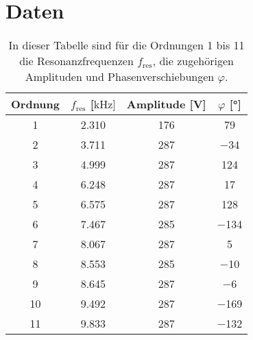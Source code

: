 \newpage
\section{Daten}
    \begin{table}[h]
        \centering
        \caption{In dieser Tabelle sind für die Ordnungen 1 bis 11 die Resonanzfrequenzen $f_{\text{res}}$, die zugehörigen Amplituden und Phasenverschiebungen $\varphi$.}
        \label{tab:phasenverschiebung}
        \begin{tabular}{c c c c}
        \toprule
        {Ordnung} & {$f_{\text{res}}$ [$\si{\kilo\hertz}]$} & {Amplitude [V]} & {$\varphi$ [°]} \\
        \midrule
        \num{1}  &  \num{2.310}  &  \num{176}  & \num{79}    \\
        \num{2}  &  \num{3.711}   &  \num{287}  & \num{-34}  \\
        \num{3}  &  \num{4.999}   &  \num{287}  & \num{124}  \\
        \num{4}  &  \num{6.248}   &  \num{287}  & \num{17}   \\
        \num{5}  &  \num{6.575}   &  \num{287}  & \num{128}  \\
        \num{6}  &  \num{7.467}   &  \num{285}  & \num{-134} \\
        \num{7}  &  \num{8.067}   &  \num{287}  & \num{5}    \\
        \num{8}  &  \num{8.553}   &  \num{285}  & \num{-10}  \\
        \num{9}  &  \num{8.645}   &  \num{287}  & \num{-6}   \\
        \num{10} &  \num{9.492}   &  \num{287}  & \num{-169} \\   
        \num{11} &  \num{9.833}   &  \num{287}  & \num{-132} \\                    
        \bottomrule
        \end{tabular}
    \end{table}

    \FloatBarrier

